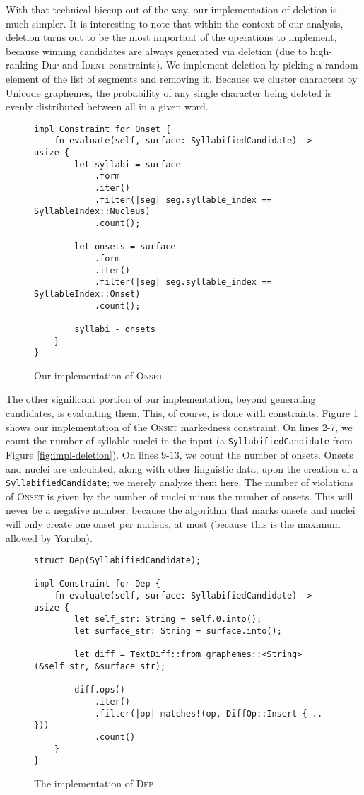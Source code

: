 \documentclass[12pt]{article}
\newcommand{\ident}{\textsc{Ident}}
\newcommand{\dep}{\textsc{Dep}}
\newcommand{\onset}{\textsc{Onset}}
\begin{document}
With that technical hiccup out of the way, our implementation of deletion is much
simpler. It is interesting to note that within the context of our analysis,
deletion turns out to be the most important of the operations to implement, because
winning candidates are always generated via deletion (due to high-ranking \dep{}
and \ident{} constraints). We implement deletion by picking a random element of
the list of segments and removing it. Because we cluster characters by Unicode
graphemes, the probability of any single character being deleted is evenly
distributed between all in a given word.

\begin{figure}[h!]
\caption{Our implementation of \onset}
\label{fig:impl-onset}
\begin{verbatim}
impl Constraint for Onset {
    fn evaluate(self, surface: SyllabifiedCandidate) -> usize {
        let syllabi = surface
            .form
            .iter()
            .filter(|seg| seg.syllable_index == SyllableIndex::Nucleus)
            .count();

        let onsets = surface
            .form
            .iter()
            .filter(|seg| seg.syllable_index == SyllableIndex::Onset)
            .count();

        syllabi - onsets
    }
}
\end{verbatim}
\end{figure}

The other significant portion of our implementation, beyond generating
candidates, is evaluating them. This, of course, is done with constraints.
Figure \ref{fig:impl-onset} shows our implementation of the \onset{}
markedness constraint. On lines 2-7, we count the number of syllable
nuclei in the input (a \texttt{SyllabifiedCandidate} from Figure
\ref{fig:impl-deletion}). On lines 9-13, we count the number of onsets.
Onsets and nuclei are calculated, along with other linguistic data, upon
the creation of a \texttt{SyllabifiedCandidate}; we merely analyze them
here. The number of violations of \onset{} is given by the number of
nuclei minus the number of onsets. This will never be a negative number,
because the algorithm that marks onsets and nuclei will only create one
onset per nucleus, at most (because this is the maximum allowed by
Yoruba).

\begin{figure}[h]
\caption{The implementation of \dep}
\label{fig:impl-dep}
\begin{verbatim}
struct Dep(SyllabifiedCandidate);

impl Constraint for Dep {
    fn evaluate(self, surface: SyllabifiedCandidate) -> usize {
        let self_str: String = self.0.into();
        let surface_str: String = surface.into();

        let diff = TextDiff::from_graphemes::<String>(&self_str, &surface_str);

        diff.ops()
            .iter()
            .filter(|op| matches!(op, DiffOp::Insert { .. }))
            .count()
    }
}
\end{verbatim}
\end{figure}
\end{document}
